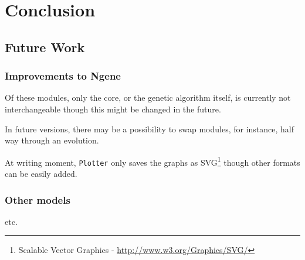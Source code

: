 \section{Conclusion}

\subsection{Future Work}

\subsubsection{Improvements to Ngene}

Of these modules, only the core, or the genetic algorithm itself, is currently not interchangeable though this might be changed in the future. 

In future versions, there may be a possibility to swap modules, for instance, half way through an evolution.

At writing moment, \texttt{Plotter} only saves the graphs as SVG\footnote{Scalable Vector Graphics - \url{http://www.w3.org/Graphics/SVG/}} though other formats can be easily added.

\subsubsection{Other models}

etc.

